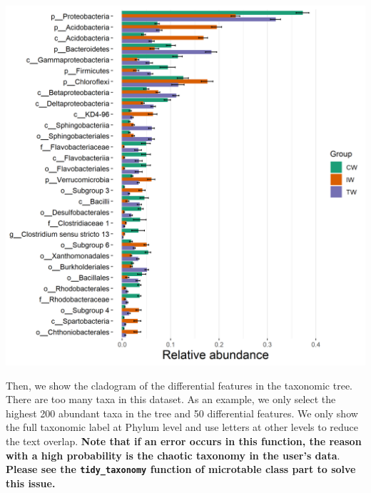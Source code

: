 \documentclass[
]{book}
\newenvironment{Shaded}{\begin{snugshade}}{\end{snugshade}}
\newcommand{\AttributeTok}[1]{\textcolor[rgb]{0.77,0.63,0.00}{#1}}
\newcommand{\CommentTok}[1]{\textcolor[rgb]{0.56,0.35,0.01}{\textit{#1}}}
\newcommand{\DecValTok}[1]{\textcolor[rgb]{0.00,0.00,0.81}{#1}}
\newcommand{\FunctionTok}[1]{\textcolor[rgb]{0.00,0.00,0.00}{#1}}
\newcommand{\NormalTok}[1]{#1}
\newcommand{\SpecialCharTok}[1]{\textcolor[rgb]{0.00,0.00,0.00}{#1}}
\newcommand{\StringTok}[1]{\textcolor[rgb]{0.31,0.60,0.02}{#1}}
\begin{document}
\begin{center}\includegraphics[width=650px]{Images/plot_lefse_diff_abund} \end{center}

Then, we show the cladogram of the differential features in the taxonomic tree.
There are too many taxa in this dataset.
As an example, we only select the highest 200 abundant taxa in the tree and 50 differential features.
We only show the full taxonomic label at Phylum level and use letters at other levels to reduce the text overlap.
\textbf{Note that if an error occurs in this function, the reason with a high probability is the chaotic taxonomy in the user's data}.
\textbf{Please see the \texttt{tidy\_taxonomy} function of microtable class part to solve this issue.}

\begin{Shaded}
\end{Shaded}
\end{document}
